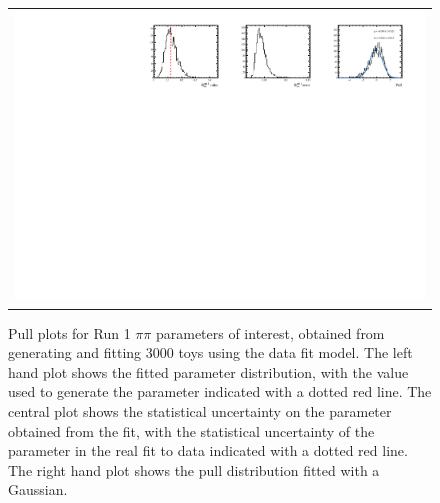 \begin{figure}
\begin{tabular}{c}
\includegraphics[width=\textwidth]{ANA_resources/Plots/Data_fit/FitterBias//R_ds_pipi_run1.pdf} \\
  \end{tabular}
  \caption{Pull plots for Run 1 $\pi\pi$ parameters of interest, obtained from generating and fitting 3000 toys using the data fit model. The left hand plot shows the fitted parameter distribution, with the value used to generate the parameter indicated with a dotted red line. The central plot shows the statistical uncertainty on the parameter obtained from the fit, with the statistical uncertainty of the parameter in the real fit to data indicated with a dotted red line. The right hand plot shows the pull distribution fitted with a Gaussian.}
\label{fig:pipi_run1_pulls}
\end{figure}
